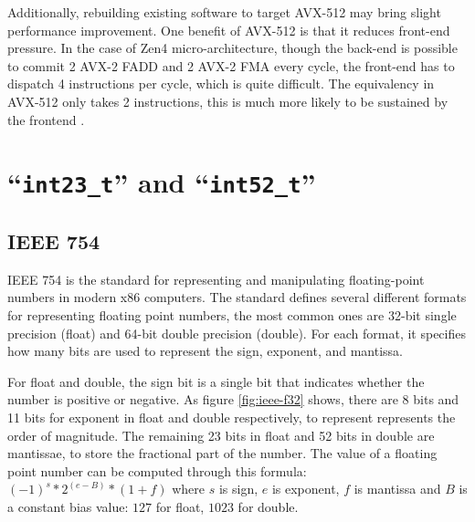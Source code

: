 \documentclass[logo,bsc,singlespacing,parskip]{infthesis}
\begin{document}
Additionally, rebuilding existing software to target AVX-512 may bring slight
performance improvement. One benefit of AVX-512 is that it reduces front-end
pressure. In the case of Zen4 micro-architecture, though the back-end is
possible to commit 2 AVX-2 FADD and 2 AVX-2 FMA every cycle, the front-end
has to dispatch 4 instructions per cycle, which is quite difficult. The
equivalency in AVX-512 only takes 2 instructions, this is much more likely to be
sustained by the frontend \cite{Zen4Critique}.


\section{``\texttt{int23\_t}'' and ``\texttt{int52\_t}''}
\label{sec:i23}
\subsection{IEEE 754}
IEEE 754 is the standard for representing and manipulating floating-point
numbers in modern x86 computers. The standard defines several different formats
for representing floating point numbers, the most common ones are 32-bit single
precision (float) and 64-bit double precision (double). For each format, it
specifies how many bits are used to represent the sign, exponent, and mantissa. 

For float and double, the sign bit is a single bit that indicates whether the
number is positive or negative. As figure \ref{fig:ieee-f32} shows, there are 8
bits and 11 bits for exponent in float and double respectively, to represent
represents the order of magnitude. The remaining 23 bits in float and 52 bits in
double are mantissae, to store the fractional part of the number. The value of a
floating point number can be computed through this formula: 
\begin{math} (-1)^s * 2^{(e - B)} * (1 + f)\end{math}
where \begin{math}s\end{math} is sign, \begin{math}e\end{math} is exponent, 
\begin{math}f\end{math} is mantissa and \begin{math}B\end{math} is a constant bias
value: \begin{math}127\end{math} for float, \begin{math}1023\end{math} for double. 
\end{document}

